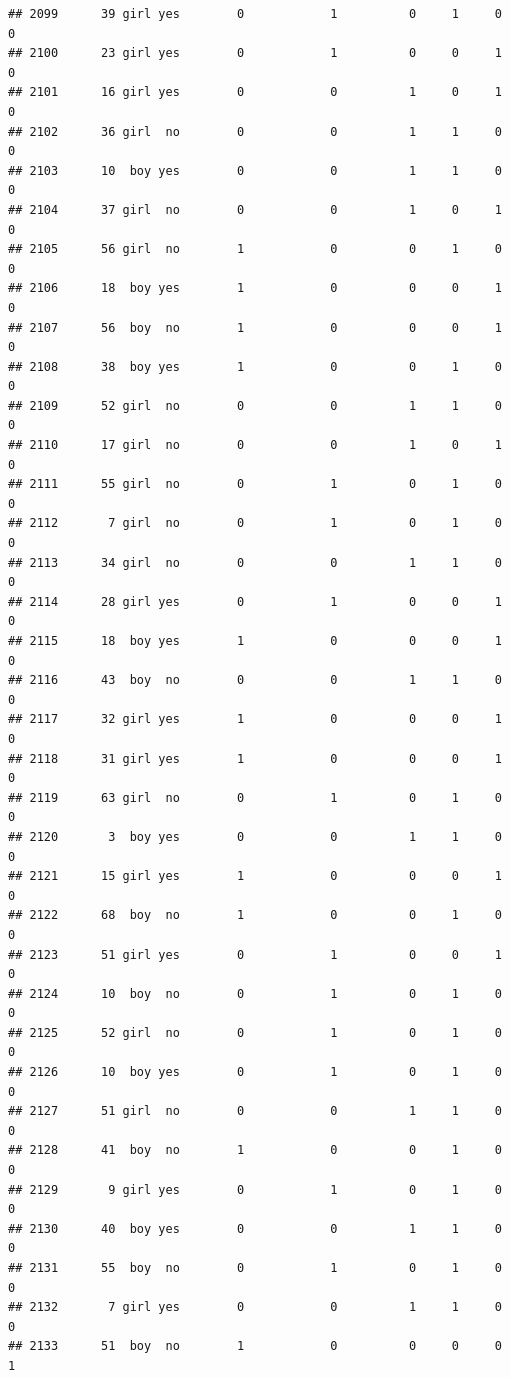 \documentclass[man]{apa6}
\begin{document}
\begin{verbatim}
## 2099      39 girl yes        0            1          0     1     0     0
## 2100      23 girl yes        0            1          0     0     1     0
## 2101      16 girl yes        0            0          1     0     1     0
## 2102      36 girl  no        0            0          1     1     0     0
## 2103      10  boy yes        0            0          1     1     0     0
## 2104      37 girl  no        0            0          1     0     1     0
## 2105      56 girl  no        1            0          0     1     0     0
## 2106      18  boy yes        1            0          0     0     1     0
## 2107      56  boy  no        1            0          0     0     1     0
## 2108      38  boy yes        1            0          0     1     0     0
## 2109      52 girl  no        0            0          1     1     0     0
## 2110      17 girl  no        0            0          1     0     1     0
## 2111      55 girl  no        0            1          0     1     0     0
## 2112       7 girl  no        0            1          0     1     0     0
## 2113      34 girl  no        0            0          1     1     0     0
## 2114      28 girl yes        0            1          0     0     1     0
## 2115      18  boy yes        1            0          0     0     1     0
## 2116      43  boy  no        0            0          1     1     0     0
## 2117      32 girl yes        1            0          0     0     1     0
## 2118      31 girl yes        1            0          0     0     1     0
## 2119      63 girl  no        0            1          0     1     0     0
## 2120       3  boy yes        0            0          1     1     0     0
## 2121      15 girl yes        1            0          0     0     1     0
## 2122      68  boy  no        1            0          0     1     0     0
## 2123      51 girl yes        0            1          0     0     1     0
## 2124      10  boy  no        0            1          0     1     0     0
## 2125      52 girl  no        0            1          0     1     0     0
## 2126      10  boy yes        0            1          0     1     0     0
## 2127      51 girl  no        0            0          1     1     0     0
## 2128      41  boy  no        1            0          0     1     0     0
## 2129       9 girl yes        0            1          0     1     0     0
## 2130      40  boy yes        0            0          1     1     0     0
## 2131      55  boy  no        0            1          0     1     0     0
## 2132       7 girl yes        0            0          1     1     0     0
## 2133      51  boy  no        1            0          0     0     0     1

\end{verbatim}
\end{document}
